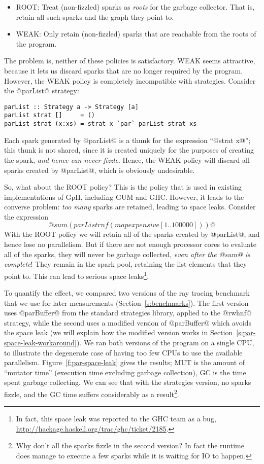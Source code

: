 \documentclass[twocolumn,9pt]{sigplanconf}
\begin{document}
\begin{itemize}
\item ROOT: Treat (non-fizzled) sparks as \emph{roots} for the garbage
  collector. That is, retain all such sparks and the graph they point to.

\item WEAK: Only retain (non-fizzled) sparks that are reachable from the roots of
  the program.
\end{itemize}
\noindent The problem is, neither of these policies is satisfactory.  WEAK seems
attractive, because it lets us discard sparks that are no longer
required by the program.  However, the WEAK policy is completely
incompatible with strategies.  Consider the @parList@ strategy:

{\small
\begin{verbatim}
parList :: Strategy a -> Strategy [a]
parList strat []     = ()
parList strat (x:xs) = strat x `par` parList strat xs
\end{verbatim}
}

Each spark generated by @parList@ is a thunk for the expression
``@strat x@''; this thunk is not shared, since it is created uniquely
for the purposes of creating the spark, \emph{and hence can never fizzle}.  
Hence, the WEAK policy will
discard all sparks created by @parList@, which is obviously
undesirable.

So, what about the ROOT policy?  This is the policy that is used in
existing implementations of GpH, including GUM \cite{Trinder:gum} and
GHC.  However, it leads to the converse problem:
\emph{too many} sparks are retained, leading to space leaks.  Consider
the expression
$$@sum (parList rnf (map expensive [1..100000]))@$$
With the ROOT policy we will retain all
of the sparks created by @parList@, and hence lose no parallelism.
But if there are not enough processor cores to evaluate all of the
sparks, they will never be garbage collected, 
\emph{even after the @sum@ is complete}!
They remain in the spark pool, retaining the list elements that they point
to.  This can lead to serious space leaks\footnote{In fact, this space
  leak was reported to the GHC team as a bug,
  \url{http://hackage.haskell.org/trac/ghc/ticket/2185}.}.

To quantify the effect, we compared two versions of the ray tracing
benchmark that we use for later measurements
(Section~\ref{s:benchmarks}).  The first version uses @parBuffer@ from
the standard strategies library, applied to the @rwhnf@ strategy,
while the second uses a modified version of @parBuffer@ which avoids
the space leak (we will explain how the modified version works in
Section~\ref{s:par-space-leak-workaround}).  We ran both versions of
the program on a single CPU, to illustrate the degenerate case of
having too few CPUs to use the available parallelism.
Figure~\ref{f:par-space-leak} gives the results; MUT is the amount of
``mutator time'' (execution time excluding garbage collection), GC is
the time spent garbage collecting.  We can see that with the
strategies version, no sparks fizzle, and the GC time suffers
considerably as a result\footnote{Why don't all the sparks fizzle in
  the second version?  In fact the runtime does manage to execute a
  few sparks while it is waiting for IO to happen.}.
\end{document}
